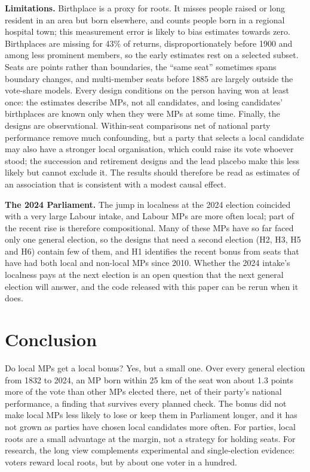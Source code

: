 \documentclass[11pt,a4paper]{article}
\begin{document}
\textbf{Limitations.} Birthplace is a proxy for roots. It misses people raised or long resident in an area but born elsewhere, and counts people born in a regional hospital town; this measurement error is likely to bias estimates towards zero. Birthplaces are missing for 43\% of returns, disproportionately before 1900 and among less prominent members, so the early estimates rest on a selected subset. Seats are points rather than boundaries, the ``same seat'' sometimes spans boundary changes, and multi-member seats before 1885 are largely outside the vote-share models. Every design conditions on the person having won at least once: the estimates describe MPs, not all candidates, and losing candidates' birthplaces are known only when they were MPs at some time. Finally, the designs are observational. Within-seat comparisons net of national party performance remove much confounding, but a party that selects a local candidate may also have a stronger local organisation, which could raise its vote whoever stood; the succession and retirement designs and the lead placebo make this less likely but cannot exclude it. The results should therefore be read as estimates of an association that is consistent with a modest causal effect.

\textbf{The 2024 Parliament.} The jump in localness at the 2024 election coincided with a very large Labour intake, and Labour MPs are more often local; part of the recent rise is therefore compositional. Many of these MPs have so far faced only one general election, so the designs that need a second election (H2, H3, H5 and H6) contain few of them, and H1 identifies the recent bonus from seats that have had both local and non-local MPs since 2010. Whether the 2024 intake's localness pays at the next election is an open question that the next general election will answer, and the code released with this paper can be rerun when it does.

\section{Conclusion}
Do local MPs get a local bonus? Yes, but a small one. Over every general election from 1832 to 2024, an MP born within 25 km of the seat won about 1.3 points more of the vote than other MPs elected there, net of their party's national performance, a finding that survives every planned check. The bonus did not make local MPs less likely to lose or keep them in Parliament longer, and it has not grown as parties have chosen local candidates more often. For parties, local roots are a small advantage at the margin, not a strategy for holding seats. For research, the long view complements experimental and single-election evidence: voters reward local roots, but by about one voter in a hundred.
\end{document}

